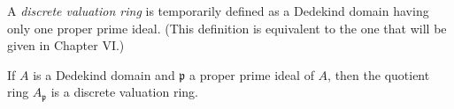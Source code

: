 A \textit{discrete valuation ring} is temporarily defined as a Dedekind domain having only one proper prime ideal. (This definition is equivalent to the one that will be given in Chapter VI.)

If $A$ is a Dedekind domain and $\mathfrak{p}$ a proper prime ideal of $A$, then the quotient ring $A_{\mathfrak{p}}$ is a discrete valuation ring.
